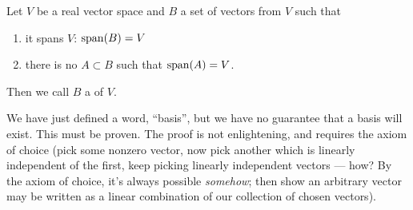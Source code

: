 \begin{definition}
Let $V$ be a real vector space and $B$ a set of vectors from $V$ such
that
\begin{enumerate}
\item it spans $V$: $\operatorname{span}(B)=V$
\item there is no $A\subset B$ such that $\operatorname{span}(A)=V$.
\end{enumerate}
Then we call $B$ a  of $V$.
\end{definition}

\begin{remark}
We have just defined a word, ``basis'', but we have no guarantee that a
basis will exist. This must be proven. The proof is not enlightening,
and requires the axiom of choice (pick some nonzero vector, now pick
another which is linearly independent of the first, keep picking
linearly independent vectors --- how? By the axiom of choice, it's
always possible \emph{somehow}; then show an arbitrary vector may be
written as a linear combination of our collection of chosen vectors).
\end{remark}

